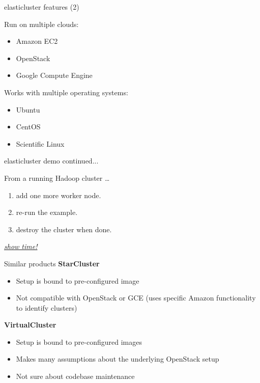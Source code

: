 \documentclass[english,serif,mathserif,usenames,dvipsnames]{beamer}
\begin{document}
\begin{frame}
  {elasticluster features (2)}

  Run on multiple clouds:

  \begin{itemize}
  \item Amazon EC2
  \item OpenStack
  \item Google Compute Engine
  \end{itemize}

  \+

  Works with multiple operating systems:

  \begin{itemize}
  \item Ubuntu
  \item CentOS
  \item Scientific Linux
  \end{itemize}
\end{frame}

\begin{frame}
  {elasticluster demo continued... }

  From a running Hadoop cluster \dots
  \begin{enumerate}
  \item add one more worker node.
  \item re-run the example.
  \item destroy the cluster when done.
  \end{enumerate}
  \pause
  \begin{center}
    \href{http://youtu.be/-Z4FaXEivVo\#t=2m12s}{\textit{show time!}}
  \end{center}
\end{frame}

\begin{frame}
  {Similar products}
  \textbf{StarCluster}
  \begin{itemize}
  \item Setup is bound to pre-configured image
  \item Not compatible with OpenStack or GCE (uses specific Amazon
    functionality to identify clusters)
  \end{itemize}

  \+

  \textbf{VirtualCluster}
  \begin{itemize}
  \item Setup is bound to pre-configured images
  \item Makes many assumptions about the underlying OpenStack setup
  \item Not sure about codebase maintenance
  \end{itemize}
\end{frame}
\end{document}
